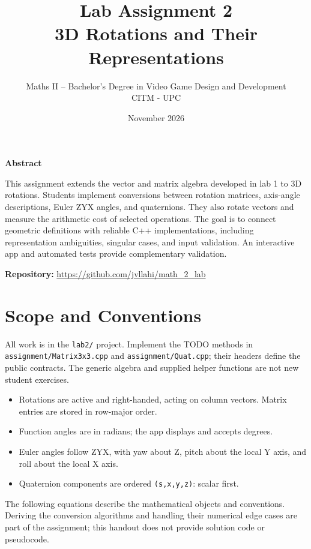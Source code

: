 \documentclass[11pt,a4paper]{article}
\title{\bfseries Lab Assignment 2\\[4pt]
\Large 3D Rotations and Their Representations}
\author{Maths II -- Bachelor's Degree in Video Game Design and Development\\CITM - UPC}
\date{November 2026}
\newenvironment{ctxbox}[1]{%
  \par\smallskip\noindent
  \begin{lrbox}{\ctxboxsv}
  \begin{minipage}{\dimexpr\linewidth-2\fboxsep-2\fboxrule\relax}
  \textbf{#1}\par\smallskip
}{%
  \end{minipage}
  \end{lrbox}%
  \noindent\colorbox{panel}{\usebox{\ctxboxsv}}\par\smallskip
}
\begin{document}
\maketitle

\begin{ctxbox}{Abstract}
This assignment extends the vector and matrix algebra developed in lab 1 to
3D rotations. Students implement conversions between rotation
matrices, axis-angle descriptions, Euler ZYX angles, and quaternions.
They also rotate vectors and measure the arithmetic cost of selected operations.
The goal is to connect geometric definitions with reliable C++ implementations,
including representation ambiguities, singular cases, and input validation.
An interactive app and automated tests provide complementary validation.
\end{ctxbox}

\textbf{Repository:} \url{https://github.com/jvllahi/math_2_lab}

\section*{Scope and Conventions}

All work is in the \texttt{lab2/} project. Implement the TODO methods in
\texttt{assignment/Matrix3x3.cpp} and \texttt{assignment/Quat.cpp}; their headers
define the public contracts. The generic algebra and supplied helper functions
are not new student exercises.

\begin{itemize}[leftmargin=*]
    \item Rotations are active and right-handed, acting on column vectors.
    Matrix entries are stored in row-major order.
    \item Function angles are in radians; the app displays and accepts degrees.
    \item Euler angles follow ZYX, with yaw about Z, pitch about the
    local Y axis, and roll about the local X axis.
    \item Quaternion components are ordered \texttt{(s,x,y,z)}: scalar first.
\end{itemize}

The following equations describe the mathematical objects and conventions.
Deriving the conversion algorithms and handling their numerical edge cases are
part of the assignment; this handout does not provide solution code or pseudocode.
\end{document}
